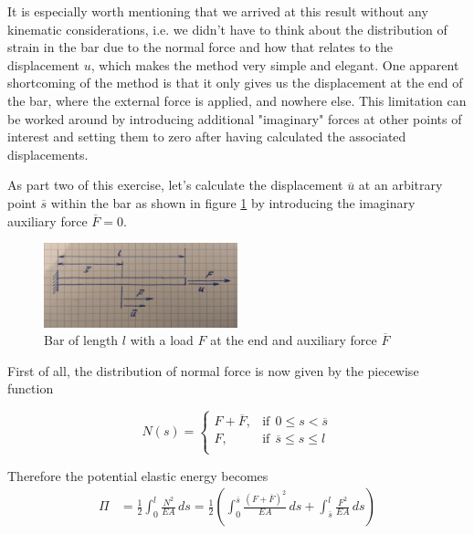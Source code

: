 It is especially worth mentioning that we arrived at this result without any kinematic considerations, i.e. we didn't have to think about the distribution of strain in the bar due to the normal force and how that relates to the displacement $u$, which makes the method very simple and elegant.
One apparent shortcoming of the method is that it only gives us the displacement at the end of the bar, where the external force is applied, and nowhere else.
This limitation can be worked around by introducing additional "imaginary" forces at other points of interest and setting them to zero after having calculated the associated displacements.

As part two of this exercise, let's calculate the displacement $\overline{u}$ at an arbitrary point $\overline{s}$ within the bar as shown in figure \ref{fig:castigliano-bar-2} by introducing the imaginary auxiliary force $\overline{F} = 0$.

\begin{figure}[h]
\centering
\includegraphics[width=0.5\textwidth]{figures/elements/castigliano-bar-2.jpg}
\caption{Bar of length $l$ with a load $F$ at the end and auxiliary force $\overline{F}$}
\label{fig:castigliano-bar-2}
\end{figure}

First of all, the distribution of normal force is now given by the piecewise function

\begin{equation}
N(s) = \begin{cases}
F + \overline{F}, & \text{if}\ \ 0 \le s < \overline{s} \\
F, & \text{if}\ \ \overline{s} \le s \le l \\
\end{cases}
\end{equation}

Therefore the potential elastic energy becomes
%
\begin{align}
\Pi &= \frac{1}{2}\int_{0}^{l}\frac{N^2}{EA}\,ds = \frac{1}{2}\left(\int_{0}^{\overline{s}}\frac{(F + \overline{F})^2}{EA}\,ds + \int_{\overline{s}}^{l}\frac{F^2}{EA}\,ds\right) \\
\end{align}

